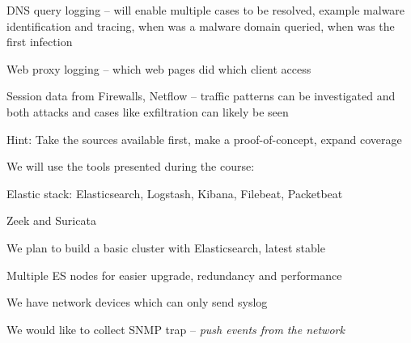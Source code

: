 \documentclass[Screen16to9,17pt]{foils}
\begin{document}
\begin{list2}
\item DNS query logging -- will enable multiple cases to be resolved, example malware identification and tracing, when was a malware domain queried, when was the first infection
\item Web proxy logging -- which web pages did which client access
\item Session data from Firewalls, Netflow -- traffic patterns can be investigated and both attacks and cases like exfiltration can likely be seen
\end{list2}

Hint: Take the sources available first, make a proof-of-concept, expand coverage







\begin{quote}

\end{quote}

We will use the tools presented during the course:
\begin{list2}
\item Elastic stack: Elasticsearch, Logstash, Kibana, Filebeat, Packetbeat
\item Zeek and Suricata
\end{list2}




\begin{list2}
\item We plan to build a basic cluster with Elasticsearch, latest stable
\item Multiple ES nodes for easier upgrade, redundancy and performance
\end{list2}






\begin{list2}
\item We have network devices which can only send syslog
\item We would like to collect SNMP trap -- \emph{push events from the network}
\end{list2}
\end{document}
